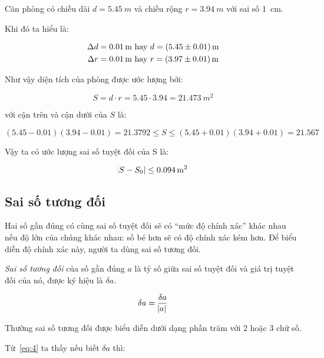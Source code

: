 \documentclass[../../Lectures.tex]{subfiles}
\begin{document}
\begin{exmp}\label{exmp:room_example}
    Căn phòng có chiều dài \(d = \SI{5.45}{m}\) và chiều rộng \(r =
    \SI{3.94}{m}\) với sai số \SI{1}{cm}.

    Khi đó ta hiểu là:

    \begin{gather*}
        \Delta d = \SI{0.01}{m} \text{ hay } d = \SI[separate-uncertainty=true]{5.45 \pm 0.01}{m} \\
        \Delta r = \SI{0.01}{m} \text{ hay } r = \SI[separate-uncertainty=true]{3.97 \pm 0.01}{m}
    \end{gather*}

    Như vậy diện tích của phòng được ước lượng bởi:

    \[S = d \cdot r = \num{5.45} \cdot \num{3.94} = \SI{21.473}{m^2}\]

    với cận trên và cận dưới của \(S\) là:

    \[(\num{5.45} - \num{0.01})(\num{3.94} - \num{0.01}) = \num{21.3792} \leq S \leq (\num{5.45} + \num{0.01})(\num{3.94} + \num{0.01}) = \num{21.567}\]

    Vậy ta có ước lượng sai số tuyệt đối của S là:

    \[\abs{S - S_0} \leq \SI{0.094}{m^2}\]
\end{exmp}

\subsection{Sai số tương đối}

Hai số gần đúng có cùng sai số tuyệt đối sẽ có ``mức độ chính xác'' khác nhau nếu
độ lớn của chúng khác nhau: số bé hơn sẽ có độ chính xác kém hơn. Để biểu diễn
độ chính xác này, người ta dùng sai số tương đối.

\begin{definition}
    \emph{Sai số tương đối} của số gần đúng \(a\) là tỷ số giữa sai số tuyệt đối
    và giá trị tuyệt đối của nó, được ký hiệu là \(\delta a\).

    \begin{equation} \label{eq:4}
        \delta a = \frac{\delta a}{\abs{a}}
    \end{equation}
\end{definition}

Thường sai số tương đối được biểu diễn dưới dạng phần trăm với 2 hoặc 3 chữ số.

Từ~\ref{eq:4} ta thấy nếu biết \(\delta a\) thì:
\end{document}
